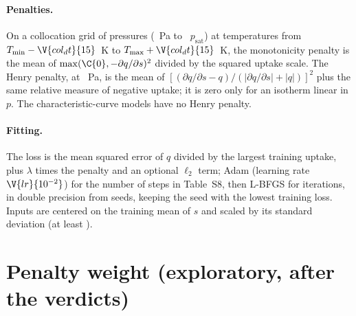 \documentclass[11pt]{article}
\begin{document}
\paragraph{Penalties.} On a collocation grid of  pressures (~Pa to ~$p_{\mathrm{sat}}$)
at  temperatures from $T_{\min} - \V{col_dt}{15}$~K to $T_{\max} + \V{col_dt}{15}$~K, the monotonicity
penalty is the mean of $\max(\C{0}, -\partial q/\partial s)^2$ divided by the squared uptake scale. The Henry penalty,
at ~Pa, is the mean of $[(\partial q/\partial s - q)/(|\partial q/\partial s| + |q|)]^2$ plus the
same relative measure of negative uptake; it is zero only for an isotherm linear in $p$. The characteristic-curve
models have no Henry penalty.

\paragraph{Fitting.} The loss is the mean squared error of $q$ divided by the largest training uptake, plus
$\lambda$ times the penalty and an optional $\ell_2$ term; Adam (learning rate $\V{lr}{10^{-2}}$) for the number of
steps in Table~S8, then L-BFGS for  iterations, in double precision from  seeds, keeping
the seed with the lowest training loss. Inputs are centered on the training mean of $s$ and scaled by its standard
deviation (at least ).

\begin{landscape}
\begin{table}[h]
\centering
\caption*{Table~S8: The models, their role in the analysis, the settings chosen on the development
set (Methods), and the number of fitted parameters. $n_{\mathrm{H}}$, $n_{\mathrm{c}}$: Henry and cooperative terms;
$n$: terms of the characteristic curve; width and depth of a network; $\ell_2$: weight decay; $\lambda$: penalty
weight. Every fit then ran L-BFGS for  iterations.}

\end{table}
\end{landscape}

\section*{Penalty weight (exploratory, after the verdicts)}
\end{document}
